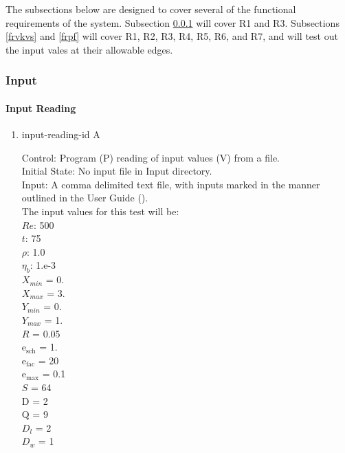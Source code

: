 \documentclass[12pt, titlepage]{article}
\newcounter{testcounter} %
\begin{document}
\label{testfr}

The subsections below are designed to cover several of the functional
requirements of the system. Subsection \ref{frinput} will cover R1 and
R3. Subsections \ref{frvkvs} and \ref{frpf} will cover R1, R2, R3, R4, R5, R6,
and R7, and will test out the input vales at their allowable edges.

\subsubsection{Input}
\label{frinput}
		
\paragraph{Input Reading}

\begin{enumerate}

\item{input-reading-id\thetestcounter
    A \label{inputreadingtest}\\}

  Control: Program (P) reading of input values (V) from a file.\\
				
  Initial State: No input file in Input directory.\\
					
  Input: A comma delimited text file, with inputs marked in the manner outlined
  in the User Guide (\citet{LBM_UserGuide_PM}).\\The input values for this test
  will be:\\$Re$: 500\\
 
  $t$: 75\\
  $\rho$: 1.0\\
  $\eta_b$: 1.e-3\\
  $X_{min}$ = 0.\\
  $X_{max}$ = 3.\\
  $Y_{min}$ = 0.\\
  $Y_{max}$ = 1.\\
  $R$ = 0.05\\
  $\mathrm{e_{sch}}$ = 1.\\
  $\mathrm{e_{fac}}$ = 20\\
  $\mathrm{e_{max}}$ = 0.1\\
  $S$ = 64\\
  $\mathrm{D}$ = 2\\
  $\mathrm{Q}$ = 9\\
  $D_{l}$ = 2\\
  $D_{w}$ = 1\\


\end{enumerate}
\end{document}
